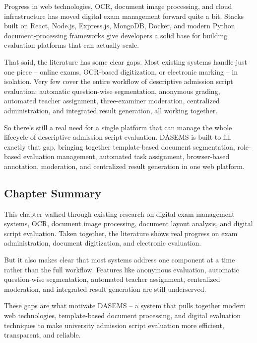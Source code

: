 Progress in web technologies, OCR, document image processing, and cloud infrastructure has moved digital exam management forward quite a bit. Stacks built on React, Node.js, Express.js, MongoDB, Docker, and modern Python document-processing frameworks give developers a solid base for building evaluation platforms that can actually scale.

That said, the literature has some clear gaps. Most existing systems handle just one piece -- online exams, OCR-based digitization, or electronic marking -- in isolation. Very few cover the entire workflow of descriptive admission script evaluation: automatic question-wise segmentation, anonymous grading, automated teacher assignment, three-examiner moderation, centralized administration, and integrated result generation, all working together.

So there's still a real need for a single platform that can manage the whole lifecycle of descriptive admission script evaluation. DASEMS is built to fill exactly that gap, bringing together template-based document segmentation, role-based evaluation management, automated task assignment, browser-based annotation, moderation, and centralized result generation in one web platform.


\subsection{Chapter Summary}

This chapter walked through existing research on digital exam management systems, OCR, document image processing, document layout analysis, and digital script evaluation. Taken together, the literature shows real progress on exam administration, document digitization, and electronic evaluation.

But it also makes clear that most systems address one component at a time rather than the full workflow. Features like anonymous evaluation, automatic question-wise segmentation, automated teacher assignment, centralized moderation, and integrated result generation are still underserved.

These gaps are what motivate DASEMS -- a system that pulls together modern web technologies, template-based document processing, and digital evaluation techniques to make university admission script evaluation more efficient, transparent, and reliable.